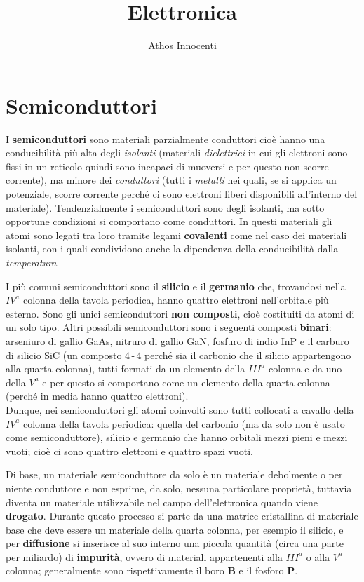 \documentclass[12pt, a4paper]{report}
\author{Athos Innocenti}
\title{\Huge Elettronica}\date{}\author{}
\begin{document}
\maketitle
\tableofcontents
\chapter{Semiconduttori}
I \textbf{semiconduttori} sono materiali parzialmente conduttori cioè hanno una conducibilità più alta degli \textit{isolanti} (materiali \textit{dielettrici} in cui gli elettroni sono fissi in un reticolo quindi sono incapaci di muoversi e per questo non scorre corrente), ma minore dei \textit{conduttori} (tutti i \textit{metalli} nei quali, se si applica un potenziale, scorre corrente perché ci sono elettroni liberi disponibili all'interno del materiale). Tendenzialmente i semiconduttori sono degli isolanti, ma sotto opportune condizioni si comportano come conduttori. In questi materiali gli atomi sono legati tra loro tramite legami \textbf{covalenti} come nel caso dei materiali isolanti, con i quali condividono anche la dipendenza della conducibilità dalla \textit{temperatura}.

I più comuni semiconduttori sono il \textbf{silicio} e il \textbf{germanio} che, trovandosi nella $IV^{a}$ colonna della tavola periodica, hanno quattro elettroni nell'orbitale più esterno. Sono gli unici semiconduttori \textbf{non composti}, cioè costituiti da atomi di un solo tipo. Altri possibili semiconduttori sono i seguenti composti \textbf{binari}: arseniuro di gallio GaAs, nitruro di gallio GaN, fosfuro di indio InP e il carburo di silicio SiC (un composto 4\,-\,4 perché sia il carbonio che il silicio appartengono alla quarta colonna), tutti formati da un elemento della $III^{a}$ colonna e da uno della $V^{a}$ e per questo si comportano come un elemento della quarta colonna (perché in media hanno quattro elettroni).\\Dunque, nei semiconduttori gli atomi coinvolti sono tutti collocati a cavallo della $IV^{a}$ colonna della tavola periodica: quella del carbonio (ma da solo non è usato come semiconduttore), silicio e germanio che hanno orbitali mezzi pieni e mezzi vuoti; cioè ci sono quattro elettroni e quattro spazi vuoti.

Di base, un materiale semiconduttore da solo è un materiale debolmente o per niente conduttore e non esprime, da solo, nessuna particolare proprietà, tuttavia diventa un materiale utilizzabile nel campo dell'elettronica quando viene \textbf{drogato}. Durante questo processo si parte da una matrice cristallina di materiale base che deve essere un materiale della quarta colonna, per esempio il silicio, e per \textbf{diffusione} si inserisce al suo interno una piccola quantità (circa una parte per miliardo) di \textbf{impurità}, ovvero di materiali appartenenti alla $III^{a}$ o alla $V^{a}$ colonna; generalmente sono rispettivamente il boro \textbf{B} e il fosforo \textbf{P}.
\end{document}
